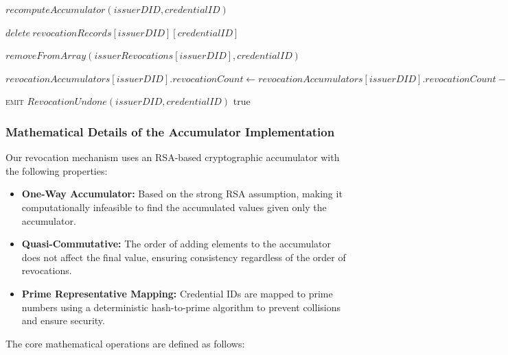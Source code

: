 \documentclass[lettersize,journal]{IEEEtran}
\begin{document}
\begin{algorithm}
\begin{algorithmic}[1]
    \State $recomputeAccumulator(issuerDID, credentialID)$
    
    \State $delete\ revocationRecords[issuerDID][credentialID]$
    
    \State $removeFromArray(issuerRevocations[issuerDID], credentialID)$
    
    \State $revocationAccumulators[issuerDID].revocationCount \gets revocationAccumulators[issuerDID].revocationCount - 1$
    
    \State \textsc{emit} $RevocationUndone(issuerDID, credentialID)$
    \RETURN true
\EndProcedure
\end{algorithmic}
\end{algorithm}

\subsubsection{Mathematical Details of the Accumulator Implementation}

Our revocation mechanism uses an RSA-based cryptographic accumulator with the following properties:

\begin{itemize}
    \item \textbf{One-Way Accumulator:} Based on the strong RSA assumption, making it computationally infeasible to find the accumulated values given only the accumulator.
    
    \item \textbf{Quasi-Commutative:} The order of adding elements to the accumulator does not affect the final value, ensuring consistency regardless of the order of revocations.
    
    \item \textbf{Prime Representative Mapping:} Credential IDs are mapped to prime numbers using a deterministic hash-to-prime algorithm to prevent collisions and ensure security.
\end{itemize}

The core mathematical operations are defined as follows:
\end{document}
